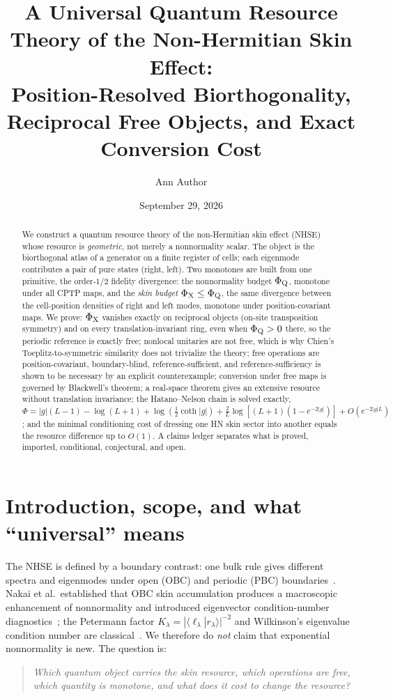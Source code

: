 \documentclass[11pt]{article}
\newcommand{\PhiQ}{\Phi_{\rm Q}}
\newcommand{\PhiX}{\Phi_{\rm X}}
\newcommand{\ip}[2]{\langle #1|#2\rangle}
\begin{document}
\title{A Universal Quantum Resource Theory of the Non-Hermitian Skin Effect:\\
Position-Resolved Biorthogonality, Reciprocal Free Objects, and Exact Conversion Cost}
\author{Ann Author}
\date{September 29, 2026}
\maketitle

\begin{abstract}
We construct a quantum resource theory of the non-Hermitian skin effect (NHSE) whose resource is
\emph{geometric}, not merely a nonnormality scalar. The object is the biorthogonal atlas of a
generator on a finite register of cells; each eigenmode contributes a pair of pure states (right, left).
Two monotones are built from one primitive, the order-$1/2$ fidelity divergence: the nonnormality budget
$\PhiQ$, monotone under all CPTP maps, and the \emph{skin budget} $\PhiX\le\PhiQ$, the same divergence
between the cell-position densities of right and left modes, monotone under position-covariant maps.
We prove: $\PhiX$ vanishes exactly on reciprocal objects (on-site transposition symmetry) and on every
translation-invariant ring, even when $\PhiQ>0$ there, so the periodic reference is exactly free;
nonlocal unitaries are not free, which is why Chien's Toeplitz-to-symmetric similarity does not trivialize the theory;
free operations are position-covariant, boundary-blind, reference-sufficient, and reference-sufficiency is shown to be necessary by an explicit
counterexample; conversion under free maps is governed by Blackwell's theorem; a real-space theorem gives
an extensive resource without translation invariance; the Hatano--Nelson chain is solved exactly,
$\Phi=|g|(L-1)-\log(L+1)+\log(\tfrac12\coth|g|)+\tfrac2L\log[(L+1)(1-e^{-2|g|})]+O(e^{-2|g|L})$; and the
minimal conditioning cost of dressing one HN skin sector into another equals the resource difference up to $O(1)$.
A claims ledger separates what is proved, imported, conditional, conjectural, and open.
\end{abstract}

\section{Introduction, scope, and what ``universal'' means}
The NHSE is defined by a boundary contrast: one bulk rule gives different spectra and eigenmodes under open (OBC) and
periodic (PBC) boundaries~\cite{HN,YaoWang,Okuma}. Nakai et al.\ established that OBC skin accumulation produces a macroscopic
enhancement of nonnormality and introduced eigenvector condition-number diagnostics~\cite{Nakai}; the Petermann factor
$K_\lambda=|\ip{\ell_\lambda}{r_\lambda}|^{-2}$ and Wilkinson's eigenvalue condition number are classical~\cite{Petermann,Siegman}.
We therefore do \emph{not} claim that exponential nonnormality is new. The question is:
\begin{quote}\emph{Which quantum object carries the skin resource, which operations are free, which quantity is monotone, and what does it cost to change the resource?}
\end{quote}
\end{document}

